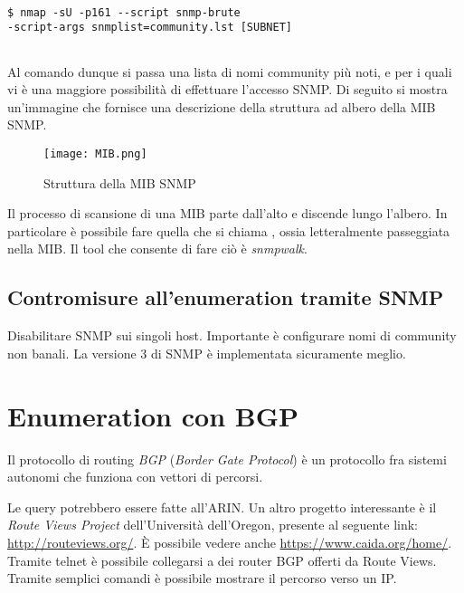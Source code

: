 \documentclass[14pt]{extreport}
\begin{document}
\vspace{5pt}

{
\small
\begin{tcolorbox}

\begin{verbatim}

$ nmap -sU -p161 --script snmp-brute 
-script-args snmplist=community.lst [SUBNET]
  
\end{verbatim}

\end{tcolorbox}
}

\vspace{5pt}

Al comando dunque si passa una lista di nomi community più noti, e per i quali vi è una maggiore possibilità di effettuare l'accesso SNMP.
Di seguito si mostra un'immagine che fornisce una descrizione della struttura ad albero della MIB SNMP.


\begin{figure}[H]
    \centering
    \texttt{[image: MIB.png]}
    \caption{Struttura della MIB SNMP}
    \label{label the figure}
\end{figure}

Il processo di scansione di una MIB parte dall'alto e discende lungo l'albero. In particolare è possibile fare quella che si chiama , ossia letteralmente passeggiata nella MIB. Il tool che consente di fare ciò è \textit{snmpwalk}.


\subsection{Contromisure all'enumeration tramite SNMP}

Disabilitare SNMP sui singoli host. Importante è configurare nomi di community non banali. La versione 3 di SNMP è implementata sicuramente meglio. 



\section{Enumeration con BGP}
Il protocollo di routing \textit{BGP} (\textit{Border Gate Protocol}) è un protocollo fra sistemi autonomi che funziona con vettori di percorsi.

Le query potrebbero essere fatte all'ARIN. Un altro progetto interessante è il \textit{Route Views Project} dell'Università dell'Oregon, presente al seguente link: \url{http://routeviews.org/}. È possibile vedere anche \url{https://www.caida.org/home/}.
Tramite telnet è possibile collegarsi a dei router BGP offerti da Route Views.
Tramite semplici comandi è possibile mostrare il percorso verso un IP.
\end{document}
